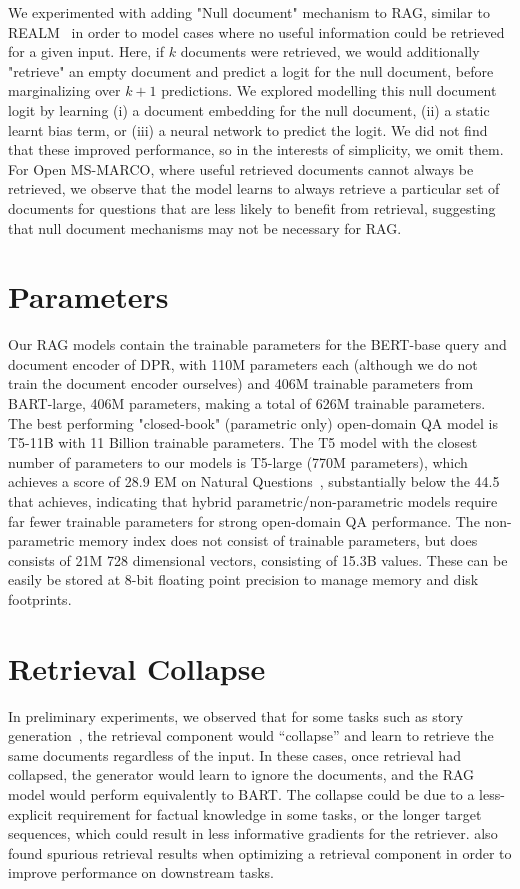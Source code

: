 We experimented with adding "Null document" mechanism to RAG, similar to REALM~\cite{guu2020realm} in order to model cases where no useful information could be retrieved for a given input. Here, if $k$ documents were retrieved, we would additionally "retrieve" an empty document and predict a logit for the null document, before marginalizing over $k+1$ predictions. We explored modelling this null document logit by learning (i) a document embedding for the null document, (ii) a static learnt bias term, or (iii) a neural network to predict the logit. We did not find that these improved performance, so in the interests of simplicity, we omit them. For Open MS-MARCO, where useful retrieved documents cannot always be retrieved, we observe that the model learns to always retrieve a particular set of documents for questions that are less likely to benefit from retrieval, suggesting that null document mechanisms may not be necessary for RAG. 

\section{Parameters}

Our RAG models contain the trainable parameters for the BERT-base query and document encoder of DPR, with 110M parameters each (although we do not train the document encoder ourselves) and 406M trainable parameters from BART-large, 406M parameters, making a total of 626M trainable parameters. The best performing "closed-book" (parametric only) open-domain QA model is T5-11B with 11 Billion trainable parameters. The T5 model with the closest number of parameters to our models is T5-large (770M parameters), which achieves a score of 28.9 EM on Natural Questions~\cite{roberts2020t5cqba}, substantially below the 44.5 that \raganswer{} achieves, indicating that hybrid parametric/non-parametric models require far fewer trainable parameters for strong open-domain QA performance. The non-parametric memory index does not consist of trainable parameters, but does consists of 21M 728 dimensional vectors, consisting of 15.3B values. These can be easily be stored at 8-bit floating point precision to manage memory and disk footprints.

\section{Retrieval Collapse}

In preliminary experiments, we observed that for some tasks such as story generation~\cite{fan-etal-2018-hierarchical}, the retrieval component would ``collapse'' and learn to retrieve the same documents regardless of the input. In these cases, once retrieval had collapsed, the generator would learn to ignore the documents, and the RAG model would perform equivalently to BART.
The collapse could be due to a less-explicit requirement for factual knowledge in some tasks, or the longer target sequences, which could result in less informative gradients for the retriever. \citet{perez-etal-2019-finding} also found spurious retrieval results when optimizing a retrieval component in order to improve performance on downstream tasks.



